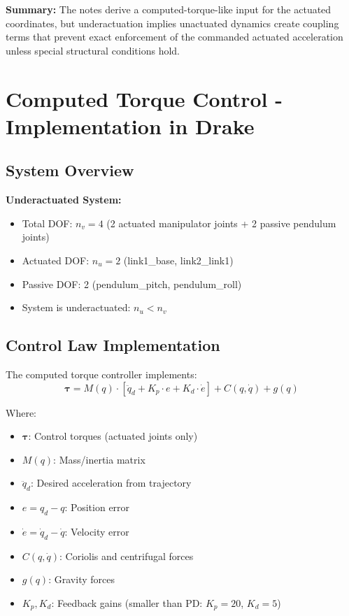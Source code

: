 \bigskip
\noindent
\textbf{Summary:} The notes derive a computed-torque-like input for the actuated coordinates, but underactuation implies unactuated dynamics create coupling terms that prevent exact enforcement of the commanded actuated acceleration unless special structural conditions hold.

\section*{Computed Torque Control - Implementation in Drake}

\subsection*{System Overview}
\textbf{Underactuated System:}
\begin{itemize}
\item Total DOF: $n_v = 4$ (2 actuated manipulator joints + 2 passive pendulum joints)
\item Actuated DOF: $n_u = 2$ (link1\_base, link2\_link1)
\item Passive DOF: 2 (pendulum\_pitch, pendulum\_roll)
\item System is underactuated: $n_u < n_v$
\end{itemize}

\subsection*{Control Law Implementation}

The computed torque controller implements:
\begin{equation}
\boldsymbol{\tau} = M(q) \cdot [\ddot{q}_d + K_p \cdot e + K_d \cdot \dot{e}] + C(q,\dot{q}) + g(q)
\end{equation}

Where:
\begin{itemize}
\item $\boldsymbol{\tau}$: Control torques (actuated joints only)
\item $M(q)$: Mass/inertia matrix
\item $\ddot{q}_d$: Desired acceleration from trajectory
\item $e = q_d - q$: Position error
\item $\dot{e} = \dot{q}_d - \dot{q}$: Velocity error  
\item $C(q,\dot{q})$: Coriolis and centrifugal forces
\item $g(q)$: Gravity forces
\item $K_p, K_d$: Feedback gains (smaller than PD: $K_p=20$, $K_d=5$)
\end{itemize}

